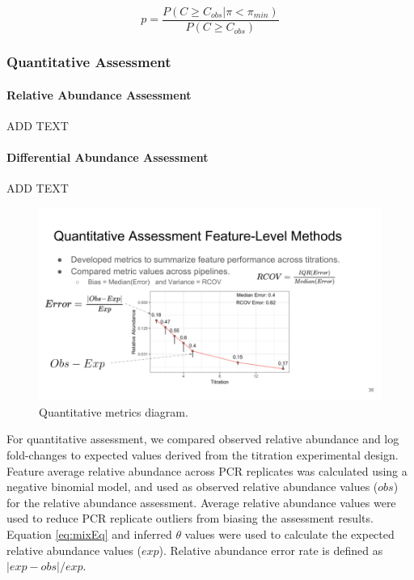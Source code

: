 \documentclass[linenumbers]{bmcart}
\begin{document}
\begin{equation}
p = \frac{P(C \geq C_{obs}| \pi < \pi_{min})}{P(C \geq C_{obs})}
  \label{eq:bht2}
\end{equation}

\subsubsection*{Quantitative Assessment}

\paragraph{Relative Abundance Assessment}
ADD TEXT

\paragraph{Differential Abundance Assessment}
ADD TEXT

\begin{figure}
\centering
\includegraphics{quant_metrics.png}
\caption{\label{fig:quantMetrics} Quantitative metrics diagram.}
\end{figure}


For quantitative assessment, we compared observed relative abundance and
log fold-changes to expected values derived from the titration
experimental design. Feature average relative abundance across PCR
replicates was calculated using a negative binomial model, and used as
observed relative abundance values (\(obs\)) for the relative abundance
assessment. Average relative abundance values were used to reduce PCR
replicate outliers from biasing the assessment results. Equation
\eqref{eq:mixEq} and inferred \(\theta\) values were used to calculate the
expected relative abundance values (\(exp\)). Relative abundance error
rate is defined as \(|exp - obs|/exp\).
\end{document}

